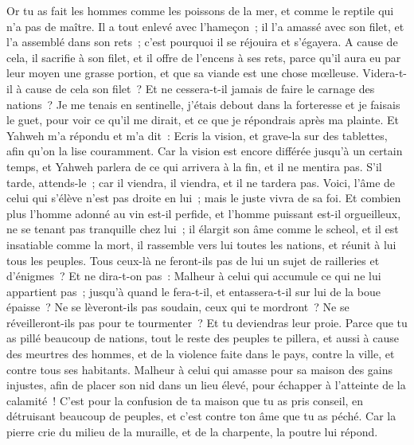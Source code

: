 \begin{multicols}{2}
Or tu as fait les hommes comme les poissons de la mer, et comme le reptile qui n'a pas de maître.
Il a tout enlevé avec l'hameçon~; il l'a amassé avec son filet, et l'a assemblé dans son rets~; c'est pourquoi il se réjouira et s'égayera.
A cause de cela, il sacrifie à son filet, et il offre de l'encens à ses rets, parce qu'il aura eu par leur moyen une grasse portion, et que sa viande est une chose mœlleuse.
Videra-t-il à cause de cela son filet~? Et ne cessera-t-il jamais de faire le carnage des nations~?
\VerseOne{}Je me tenais en sentinelle, j'étais debout dans la forteresse et je faisais le guet, pour voir ce qu'il me dirait, et ce que je répondrais après ma plainte.
Et Yahweh m'a répondu et m'a dit~: Ecris la vision, et grave-la sur des tablettes, afin qu'on la lise couramment.
Car la vision est encore différée jusqu'à un certain temps, et Yahweh parlera de ce qui arrivera à la fin, et il ne mentira pas. S'il tarde, attends-le~; car il viendra, il viendra, et il ne tardera pas.
Voici, l'âme de celui qui s'élève n'est pas droite en lui~; mais le juste vivra de sa foi.
Et combien plus l'homme adonné au vin est-il perfide, et l'homme puissant est-il orgueilleux, ne se tenant pas tranquille chez lui~; il élargit son âme comme le scheol, et il est insatiable comme la mort, il rassemble vers lui toutes les nations, et réunit à lui tous les peuples.
Tous ceux-là ne feront-ils pas de lui un sujet de railleries et d'énigmes~? Et ne dira-t-on pas~: Malheur à celui qui accumule ce qui ne lui appartient pas~; jusqu'à quand le fera-t-il, et entassera-t-il sur lui de la boue épaisse~?
Ne se lèveront-ils pas soudain, ceux qui te mordront~? Ne se réveilleront-ils pas pour te tourmenter~? Et tu deviendras leur proie.
Parce que tu as pillé beaucoup de nations, tout le reste des peuples te pillera, et aussi à cause des meurtres des hommes, et de la violence faite dans le pays, contre la ville, et contre tous ses habitants.
Malheur à celui qui amasse pour sa maison des gains injustes, afin de placer son nid dans un lieu élevé, pour échapper à l'atteinte de la calamité~!
C'est pour la confusion de ta maison que tu as pris conseil, en détruisant beaucoup de peuples, et c'est contre ton âme que tu as péché.
Car la pierre crie du milieu de la muraille, et de la charpente, la poutre lui répond.

\end{multicols}
